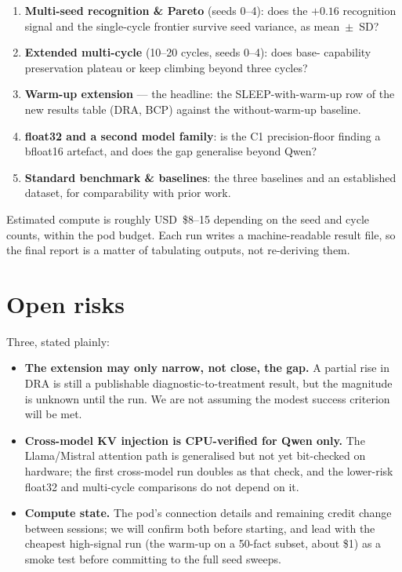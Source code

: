 \documentclass[11pt]{article}
\begin{document}
\begin{enumerate}
  \item \textbf{Multi-seed recognition \& Pareto} (seeds 0--4): does the
    $+0.16$ recognition signal and the single-cycle frontier survive seed
    variance, as mean~$\pm$~SD?
  \item \textbf{Extended multi-cycle} (10--20 cycles, seeds 0--4): does base-
    capability preservation plateau or keep climbing beyond three cycles?
  \item \textbf{Warm-up extension} --- the headline: the SLEEP-with-warm-up row
    of the new results table (DRA, BCP) against the without-warm-up baseline.
  \item \textbf{float32 and a second model family}: is the C1 precision-floor
    finding a bfloat16 artefact, and does the gap generalise beyond Qwen?
  \item \textbf{Standard benchmark \& baselines}: the three baselines and an
    established dataset, for comparability with prior work.
\end{enumerate}

Estimated compute is roughly USD~\$8--15 depending on the seed and cycle counts,
within the pod budget. Each run writes a machine-readable result file, so the
final report is a matter of tabulating outputs, not re-deriving them.

\section{Open risks}
\label{sec:risks}

Three, stated plainly:

\begin{itemize}
  \item \textbf{The extension may only narrow, not close, the gap.} A partial
    rise in DRA is still a publishable diagnostic-to-treatment result, but the
    magnitude is unknown until the run. We are not assuming the modest success
    criterion will be met.
  \item \textbf{Cross-model KV injection is CPU-verified for Qwen only.} The
    Llama/Mistral attention path is generalised but not yet bit-checked on
    hardware; the first cross-model run doubles as that check, and the
    lower-risk float32 and multi-cycle comparisons do not depend on it.
  \item \textbf{Compute state.} The pod's connection details and remaining
    credit change between sessions; we will confirm both before starting, and
    lead with the cheapest high-signal run (the warm-up on a 50-fact subset,
    about \$1) as a smoke test before committing to the full seed sweeps.
\end{itemize}
\end{document}
